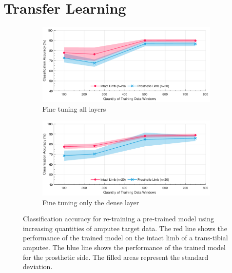 \section{Transfer Learning}
\label{sec:amputee-transfer}
\begin{figure}[hbtp]
    \centering
    \begin{subfigure}{\textwidth}
        \includegraphics[width=\textwidth]{content/6-Amputee/ch6_pre_trained_model_accuracy.pdf}
        \caption{Fine tuning all layers}
    \end{subfigure}
    \begin{subfigure}{\textwidth}
        \includegraphics[width=\textwidth]{content/6-Amputee/ch6_frozen_lstm_layer_accuracy.pdf}
        \caption{Fine tuning only the dense layer}
    \end{subfigure}
    \caption[Classification accuracy for re-training a pre-trained model using increasing quantities of amputee target data]{Classification accuracy for re-training a pre-trained model using increasing quantities of amputee target data. The red line shows the performance of the trained model on the intact limb of a trans-tibial amputee. The blue line shows the performance of the trained model for the prosthetic side. The filled areas represent the standard deviation.}
    \label{fig:ch6-amputee-retrain-pre-trained}
\end{figure}
